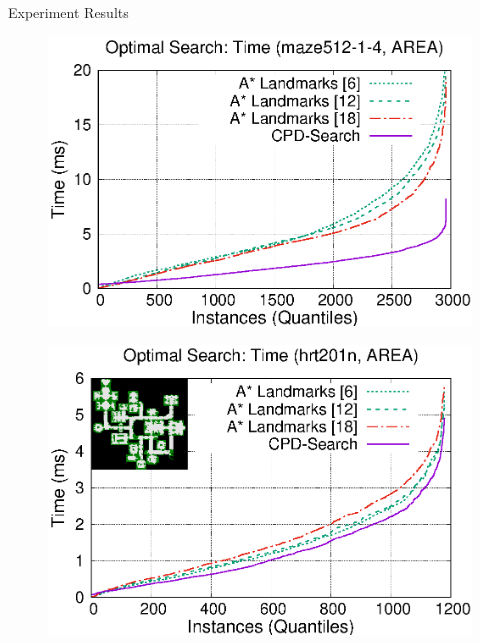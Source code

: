 \begin{frame}{Experiment Results}
    \begin{adjustwidth}{-2.5em}{-2.5em}
        \begin{minipage}{0.59\textwidth}
            \begin{figure}
                \centering
                \includegraphics[width=1.0\textwidth]{src/images/pathfinding/optimal/maze512-1-4}
            \end{figure}
        \end{minipage}%
        \begin{minipage}{0.59\textwidth}
            \begin{figure}
                \centering
                \includegraphics[width=1.0\textwidth]{src/images/pathfinding/optimal/hrt201n}
            \end{figure}
        \end{minipage}
    \end{adjustwidth}
\end{frame}
